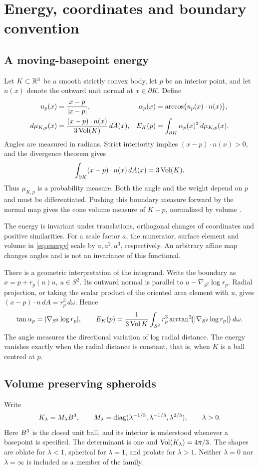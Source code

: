 \section{Energy, coordinates and boundary convention}\label{sec:definition}

\subsection{A moving-basepoint energy}
Let $K\subset\mathbb R^3$ be a smooth strictly convex body, let $p$ be an interior point, and let $n(x)$ denote the outward unit normal at $x\in\partial K$. Define
\begin{align}
 u_p(x)&=\frac{x-p}{|x-p|},&
 \alpha_p(x)&=\arccos\bigl(u_p(x)\cdot n(x)\bigr),\label{eq:angle}\\
 d\mu_{K,p}(x)&=\frac{(x-p)\cdot n(x)}{3\operatorname{Vol}(K)}\,dA(x),&
 E_K(p)&=\int_{\partial K}\alpha_p(x)^2\,d\mu_{K,p}(x).\label{eq:energy}
\end{align}
Angles are measured in radians. Strict interiority implies $(x-p)\cdot n(x)>0$, and the divergence theorem gives
\[
 \int_{\partial K}(x-p)\cdot n(x)\,dA(x)=3\operatorname{Vol}(K).
\]
Thus $\mu_{K,p}$ is a probability measure. Both the angle and the weight depend on $p$ and must be differentiated. Pushing this boundary measure forward by the normal map gives the cone volume measure of $K-p$, normalized by volume \citep{Boroczky2013,Huang2016}.

The energy is invariant under translations, orthogonal changes of coordinates and positive similarities. For a scale factor $a$, the numerator, surface element and volume in \eqref{eq:energy} scale by $a,a^2,a^3$, respectively. An arbitrary affine map changes angles and is not an invariance of this functional.

There is a geometric interpretation of the integrand. Write the boundary as $x=p+r_p(u)u$, $u\in S^2$. Its outward normal is parallel to $u-\nabla_{S^2}\log r_p$. Radial projection, or taking the scalar product of the oriented area element with $u$, gives $(x-p)\cdot n\,dA=r_p^3\,d\omega$. Hence
\[
 \tan\alpha_p=|\nabla_{S^2}\log r_p|,\qquad
 E_K(p)=\frac{1}{3\operatorname{Vol} K}\int_{S^2}r_p^3
 \arctan^2\!\bigl(|\nabla_{S^2}\log r_p|\bigr)\,d\omega .
\]
The angle measures the directional variation of log radial distance. The energy vanishes exactly when the radial distance is constant, that is, when $K$ is a ball centred at $p$.

\subsection{Volume preserving spheroids}
Write
\begin{equation}\label{eq:family}
 K_\lambda=M_\lambda B^3,\qquad
 M_\lambda=\operatorname{diag}(\lambda^{-1/3},\lambda^{-1/3},\lambda^{2/3}),\qquad\lambda>0.
\end{equation}
Here $B^3$ is the closed unit ball, and its interior is understood whenever a basepoint is specified. The determinant is one and $\operatorname{Vol}(K_\lambda)=4\pi/3$. The shapes are oblate for $\lambda<1$, spherical for $\lambda=1$, and prolate for $\lambda>1$. Neither $\lambda=0$ nor $\lambda=\infty$ is included as a member of the family.

